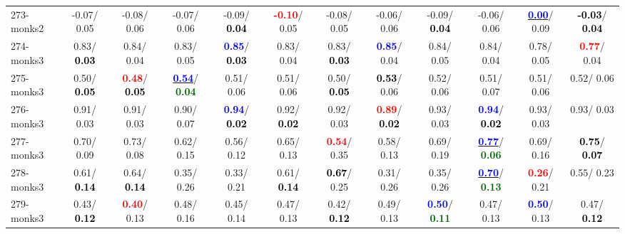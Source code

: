 \begin{table}[h]
\begin{center}
{\begin{tabular}{lc|c|c|c|c|c|c|c|c|c|c}
273-monks2 &  -0.07/  0.05 &  -0.08/  0.06 &  -0.07/  0.06 &  -0.09/\textcolor{black}{\textbf{  0.04}} & \textcolor{red}{\textbf{ -0.10}}/  0.05 &  -0.08/  0.05 &  -0.06/  0.06 &  -0.09/\textcolor{black}{\textbf{  0.04}} &  -0.06/  0.06 & \underline{\textcolor{blue}{\textbf{  0.00}}}/  0.09 & \textcolor{black}{\textbf{ -0.03}}/\textcolor{black}{\textbf{  0.04}} \\
274-monks3 &   0.83/\textcolor{black}{\textbf{  0.03}} &   0.84/  0.04 &   0.83/  0.05 & \textcolor{blue}{\textbf{  0.85}}/\textcolor{black}{\textbf{  0.03}} &   0.83/  0.04 &   0.83/\textcolor{black}{\textbf{  0.03}} & \textcolor{blue}{\textbf{  0.85}}/  0.04 &   0.84/  0.05 &   0.84/  0.04 &   0.78/  0.05 & \textcolor{red}{\textbf{  0.77}}/  0.04 \\
275-monks3 &   0.50/\textcolor{black}{\textbf{  0.05}} & \textcolor{red}{\textbf{  0.48}}/\textcolor{black}{\textbf{  0.05}} & \underline{\textcolor{blue}{\textbf{  0.54}}}/\textcolor{darkgreen}{\textbf{  0.04}} &   0.51/  0.06 &   0.51/  0.06 &   0.50/\textcolor{black}{\textbf{  0.05}} & \textcolor{black}{\textbf{  0.53}}/  0.06 &   0.52/  0.06 &   0.51/  0.07 &   0.51/  0.06 &   0.52/  0.06 \\
276-monks3 &   0.91/  0.03 &   0.91/  0.03 &   0.90/  0.07 & \textcolor{blue}{\textbf{  0.94}}/\textcolor{black}{\textbf{  0.02}} &   0.92/\textcolor{black}{\textbf{  0.02}} &   0.92/  0.03 & \textcolor{red}{\textbf{  0.89}}/\textcolor{black}{\textbf{  0.02}} &   0.93/  0.03 & \textcolor{blue}{\textbf{  0.94}}/\textcolor{black}{\textbf{  0.02}} &   0.93/  0.03 &   0.93/  0.03 \\
277-monks3 &   0.70/  0.09 &   0.73/  0.08 &   0.62/  0.15 &   0.56/  0.12 &   0.65/  0.13 & \textcolor{red}{\textbf{  0.54}}/  0.35 &   0.58/  0.13 &   0.69/  0.19 & \underline{\textcolor{blue}{\textbf{  0.77}}}/\textcolor{darkgreen}{\textbf{  0.06}} &   0.69/  0.16 & \textcolor{black}{\textbf{  0.75}}/\textcolor{black}{\textbf{  0.07}} \\ \hline
278-monks3 &   0.61/\textcolor{black}{\textbf{  0.14}} &   0.64/\textcolor{black}{\textbf{  0.14}} &   0.35/  0.26 &   0.33/  0.21 &   0.61/\textcolor{black}{\textbf{  0.14}} & \textcolor{black}{\textbf{  0.67}}/  0.25 &   0.31/  0.26 &   0.35/  0.26 & \underline{\textcolor{blue}{\textbf{  0.70}}}/\textcolor{darkgreen}{\textbf{  0.13}} & \textcolor{red}{\textbf{  0.26}}/  0.21 &   0.55/  0.23 \\
279-monks3 &   0.43/\textcolor{black}{\textbf{  0.12}} & \textcolor{red}{\textbf{  0.40}}/  0.13 &   0.48/  0.16 &   0.45/  0.14 &   0.47/  0.13 &   0.42/\textcolor{black}{\textbf{  0.12}} &   0.49/  0.13 & \textcolor{blue}{\textbf{  0.50}}/\textcolor{darkgreen}{\textbf{  0.11}} &   0.47/  0.13 & \textcolor{blue}{\textbf{  0.50}}/  0.13 &   0.47/\textcolor{black}{\textbf{  0.12}} \\

\end{tabular}}
\end{center}
\end{table}
